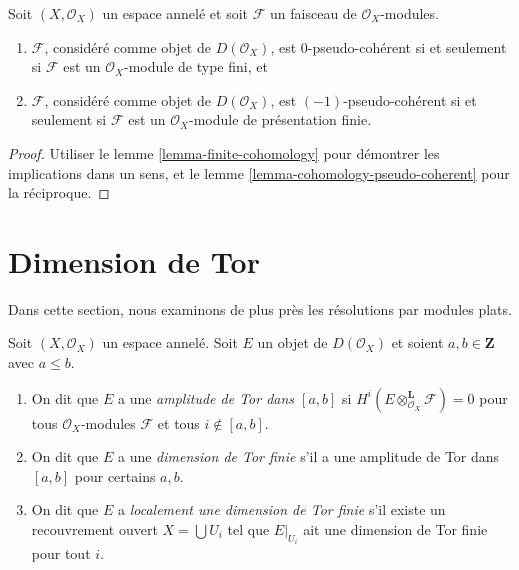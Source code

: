 {\begin{lemma}

\label{lemma-n-pseudo-module}
Soit $(X, \mathcal{O}_X)$ un espace annelé et soit $\mathcal{F}$ un faisceau de $\mathcal{O}_X$-modules.
\begin{enumerate}
\item $\mathcal{F}$, considéré comme objet de $D(\mathcal{O}_X)$, est $0$-pseudo-cohérent si et seulement si $\mathcal{F}$ est un $\mathcal{O}_X$-module de type fini, et
\item $\mathcal{F}$, considéré comme objet de $D(\mathcal{O}_X)$, est $(-1)$-pseudo-cohérent si et seulement si $\mathcal{F}$ est un $\mathcal{O}_X$-module de présentation finie.
\end{enumerate}

\end{lemma}

\begin{proof}

Utiliser le lemme \ref{lemma-finite-cohomology}
pour démontrer les implications dans un sens, et le lemme \ref{lemma-cohomology-pseudo-coherent} pour la réciproque.

\end{proof}





\section{Dimension de Tor}

\label{section-tor}

\noindent
Dans cette section, nous examinons de plus près les résolutions par modules plats.

\begin{definition}

\label{definition-tor-amplitude}

Soit $(X, \mathcal{O}_X)$ un espace annelé. Soit $E$ un objet de $D(\mathcal{O}_X)$ et soient $a, b \in \mathbf{Z}$ avec $a \leq b$.

\begin{enumerate}

\item On dit que $E$ a une {\it amplitude de Tor dans $[a, b]$}
si $H^i(E \otimes_{\mathcal{O}_X}^\mathbf{L} \mathcal{F}) = 0$
pour tous $\mathcal{O}_X$-modules $\mathcal{F}$ et tous $i \not \in [a, b]$.
\item On dit que $E$ a une {\it dimension de Tor finie}
s'il a une amplitude de Tor dans $[a, b]$ pour certains $a, b$.
\item On dit que $E$ a {\it localement une dimension de Tor finie}
s'il existe un recouvrement ouvert $X = \bigcup U_i$ tel que
$E|_{U_i}$ ait une dimension de Tor finie pour tout $i$.


\end{enumerate}
\end{definition}}
